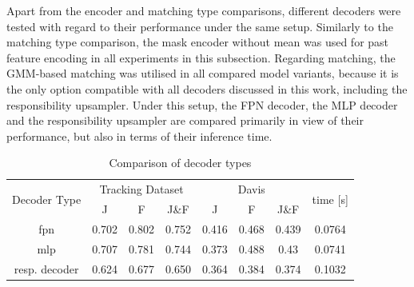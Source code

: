 Apart from the encoder and matching type comparisons, different decoders were tested with regard to their performance under the same setup. Similarly to the matching type comparison, the mask encoder without mean was used for past feature encoding in all experiments in this subsection. Regarding matching, the GMM-based matching was utilised in all compared model variants, because it is the only option compatible with all decoders discussed in this work, including the responsibility upsampler. Under this setup, the FPN decoder, the MLP decoder and the responsibility upsampler are compared primarily in view of their performance, but also in terms of their inference time. \par

\begin{table}[ht!]
\caption{Comparison of decoder types }
\centering
\begin{tabular}{|c|ccc|ccc|c|}
\hline
\multicolumn{1}{|c|}{\multirow{2}{*}{Decoder Type}} & \multicolumn{3}{c|}{Tracking Dataset} & \multicolumn{3}{c|}{Davis} 
& \multicolumn{1}{c|}{\multirow{2}{*}{time [s]}} \\ \cline{2-7} 
\multicolumn{1}{|c|}{}  & \multicolumn{1}{c|}{J} & \multicolumn{1}{c|}{F} & \multicolumn{1}{c|}{J\&F}  & \multicolumn{1}{c|}{J} & \multicolumn{1}{c|}{F} & \multicolumn{1}{c|}{J\&F} &\multicolumn{1}{c|}{}   \\ \hline

fpn  &  0.702 &  0.802 &  0.752  &  0.416  & 0.468  &  0.439  &  0.0764 \\ 
mlp         &  0.707      & 0.781   &  0.744     &  0.373 &  0.488  &  0.43  &  0.0741  \\ %

resp. decoder   &  0.624  &   0.677  & 0.650   &  0.364  &  0.384 & 0.374 & 0.1032  \\ \hline

\end{tabular}
 \label{Tab:decoder_ablations}
\end{table}

